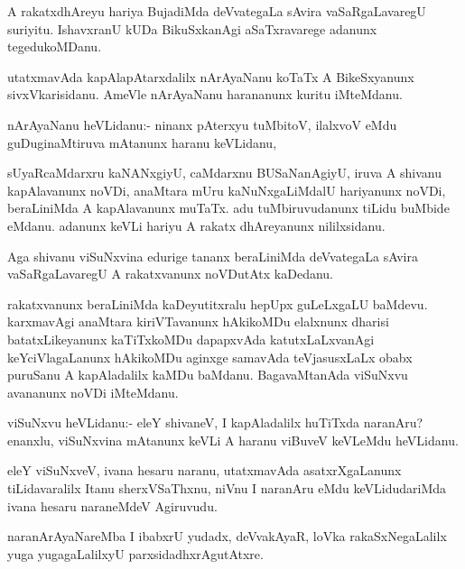 \documentclass{article}
\begin{document}
\begin{mn}
A rakatxdhAreyu hariya BujadiMda deVvategaLa sAvira vaSaRgaLavaregU
suriyitu. IshavxranU kUDa BikuSxkanAgi aSaTxravarege adanunx tegedukoMDanu.
\end{mn}

\begin{mn}
utatxmavAda kapAlapAtarxdalilx nArAyaNanu koTaTx A BikeSxyanunx
sivxVkarisidanu. AmeVle nArAyaNanu harananunx kuritu iMteMdanu.
\end{mn}

\begin{mn}
nArAyaNanu heVLidanu:- ninanx pAterxyu tuMbitoV, ilalxvoV eMdu
guDuginaMtiruva mAtanunx haranu keVLidanu,
\end{mn}

\begin{mn}%
sUyaRcaMdarxru kaNANxgiyU, caMdarxnu BUSaNanAgiyU, iruva A shivanu
kapAlavanunx noVDi, anaMtara mUru kaNuNxgaLiMdalU hariyanunx noVDi,
beraLiniMda A kapAlavanunx muTaTx. adu tuMbiruvudanunx tiLidu buMbide
eMdanu. adanunx keVLi hariyu A rakatx dhAreyanunx nililxsidanu.
\end{mn}

\begin{mn}
Aga shivanu viSuNxvina edurige tananx beraLiniMda deVvategaLa sAvira
vaSaRgaLavaregU A rakatxvanunx noVDutAtx kaDedanu.
\end{mn}

\begin{mn}%
rakatxvanunx beraLiniMda kaDeyutitxralu hepUpx guLeLxgaLU
baMdevu. karxmavAgi anaMtara kiriVTavanunx hAkikoMDu elalxnunx dharisi
batatxLikeyanunx kaTiTxkoMDu dapapxvAda katutxLaLxvanAgi
keYciVlagaLanunx hAkikoMDu aginxge samavAda teVjasusxLaLx obabx
puruSanu A kapAladalilx kaMDu baMdanu. BagavaMtanAda viSuNxvu
avananunx noVDi iMteMdanu.
\end{mn}

\begin{mn}%
viSuNxvu heVLidanu:- eleY shivaneV, I kapAladalilx huTiTxda naranAru?
enanxlu, viSuNxvina mAtanunx keVLi A haranu viBuveV keVLeMdu heVLidanu.
\end{mn}

\begin{mn}
eleY viSuNxveV, ivana hesaru naranu, utatxmavAda asatxrXgaLanunx
tiLidavaralilx Itanu sherxVSaThxnu, niVnu I naranAru eMdu
keVLidudariMda ivana hesaru naraneMdeV Agiruvudu.
\end{mn}

\begin{mn}%
naranArAyaNareMba I ibabxrU yudadx, deVvakAyaR, loVka rakaSxNegaLalilx
yuga yugagaLalilxyU parxsidadhxrAgutAtxre.
\end{mn}
\end{document}
